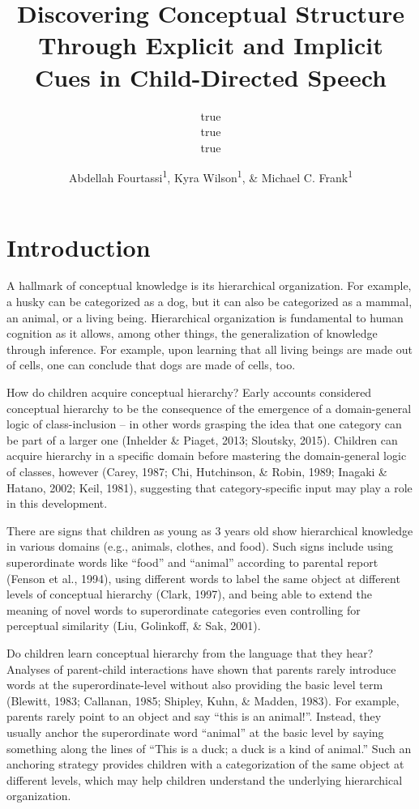 \documentclass[english,,man,floatsintext]{apa6}
\title{Discovering Conceptual Structure Through Explicit and Implicit Cues in Child-Directed Speech}
\author{true \\ true \\ true}
\date{}
\author{Abdellah Fourtassi\textsuperscript{1}, Kyra Wilson\textsuperscript{1}, \& Michael C. Frank\textsuperscript{1}}
\affiliation{
\vspace{0.5cm}
\textsuperscript{1} Department of Psychology, Stanford University}
\begin{document}
\maketitle

\hypertarget{introduction}{%
\section{Introduction}\label{introduction}}

A hallmark of conceptual knowledge is its hierarchical organization. For example, a husky can be categorized as a dog, but it can also be categorized as a mammal, an animal, or a living being. Hierarchical organization is fundamental to human cognition as it allows, among other things, the generalization of knowledge through inference. For example,
upon learning that all living beings are made out of cells, one can conclude that dogs are made of cells, too.

How do children acquire conceptual hierarchy? Early accounts considered
conceptual hierarchy to be the consequence of the emergence of a
domain-general logic of class-inclusion -- in other words grasping the idea that one category can be part of a larger one
(Inhelder \& Piaget, 2013; Sloutsky, 2015). Children can acquire hierarchy in a specific domain before mastering the domain-general logic of classes, however (Carey, 1987; Chi, Hutchinson, \& Robin, 1989; Inagaki \& Hatano, 2002; Keil, 1981), suggesting that category-specific input may play a role in this development.

There are signs that children as young as 3 years old show hierarchical knowledge in various domains (e.g., animals, clothes, and food). Such
signs include using superordinate words like \enquote{food} and \enquote{animal} according to parental report (Fenson et al., 1994), using different
words to label the same object at different levels of conceptual hierarchy (Clark, 1997), and being able to extend the meaning of novel words to superordinate categories even controlling for perceptual similarity (Liu, Golinkoff, \& Sak, 2001).

Do children learn conceptual hierarchy from the language that they hear? Analyses of parent-child interactions have shown that parents rarely introduce words at the
superordinate-level without also providing the basic level term (Blewitt, 1983; Callanan, 1985; Shipley, Kuhn, \& Madden, 1983). For example, parents rarely point to an object and say \enquote{this is an animal!}. Instead, they usually anchor the superordinate word \enquote{animal} at the basic level by saying something along the lines of \enquote{This is a duck; a duck is a kind of animal.} Such an anchoring strategy provides children with a categorization of the same object at different levels, which may help children understand the underlying hierarchical organization.
\end{document}
